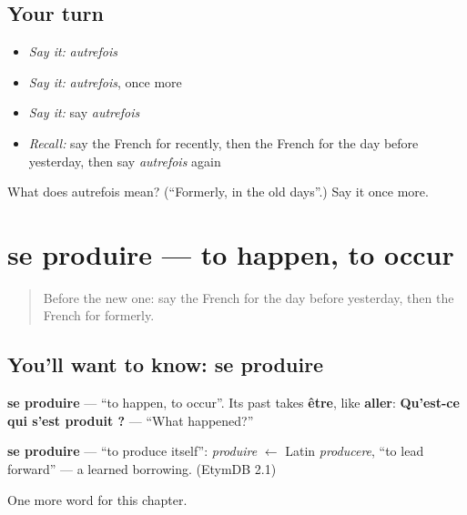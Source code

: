 \subsection*{Your turn}
\begin{itemize}
\raggedright
  \item \emph{Say it:} \emph{autrefois}
  \item \emph{Say it:} \emph{autrefois}, once more
  \item \emph{Say it:} say \emph{autrefois}
  \item \emph{Recall:} say the French for recently, then the French for the day before yesterday, then say \emph{autrefois} again
\end{itemize}

\begin{tcolorbox}[breakable,colback=teal!4,colframe=teal!35!black,title={Before you move on}]
What does autrefois mean? (\textquotedblleft{}Formerly, in the old days\textquotedblright{}.) Say it once more.
\end{tcolorbox}
\section[se produire]{se produire — to happen, to occur}

\label{lesson:FR-C140-se-produire}



\begin{quote}
Before the new one: say the French for the day before yesterday, then the French for formerly.
\end{quote}

\subsection*{You'll want to know: se produire}
\textbf{se produire} — \textquotedblleft{}to happen, to occur\textquotedblright{}. Its past takes \textbf{être}, like \textbf{aller}: \textbf{Qu'est-ce qui s'est produit ?} — \textquotedblleft{}What happened?\textquotedblright{}

\begin{cousinweb}
\textbf{se produire} — \textquotedblleft{}to produce itself\textquotedblright{}: \emph{produire} $\leftarrow$ Latin \emph{producere}, \textquotedblleft{}to lead forward\textquotedblright{} — a learned borrowing. (EtymDB 2.1)
\end{cousinweb}

\begin{grammarlens}[title={What you've built}]
One more word for this chapter.
\end{grammarlens}

